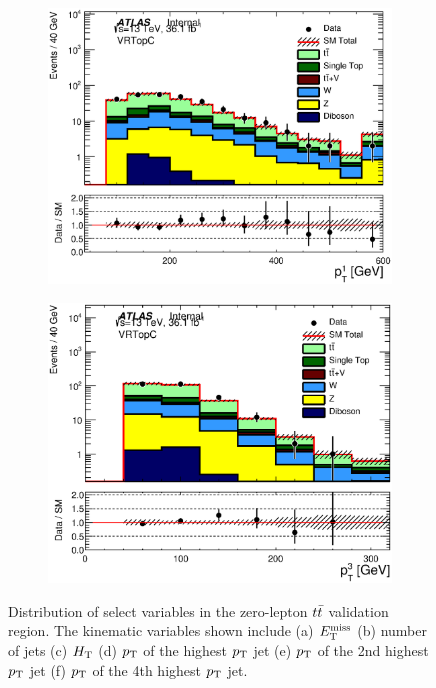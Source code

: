 \begin{figure}[h!]
\begin{center}
\begin{subfigure}[b]{0.40\textwidth}
    	 \includegraphics[width=\textwidth]{figures/plotRegion/JetPt_1__VRTopC_log.eps}
                \caption{ }
    \end{subfigure}
    \begin{subfigure}[b]{0.40\textwidth}    
    	 \includegraphics[width=\textwidth]{figures/plotRegion/JetPt_3__VRTopC_log.eps}
               \caption{ }
    \end{subfigure}
     \caption[Distribution of select variables in the zero-lepton $\ttbar$ validation region]{ Distribution of select variables in the zero-lepton $\ttbar$ validation region.  The kinematic variables shown include (a) $E_{\mathrm{T}}^{\mathrm{miss}}$ (b) number of jets (c) $H_{\mathrm{T}}$ (d) $p_{\mathrm{T}}$ of the highest $p_{\mathrm{T}}$ jet (e) $p_{\mathrm{T}}$ of the 2nd highest $p_{\mathrm{T}}$ jet (f) $p_{\mathrm{T}}$ of the 4th highest $p_{\mathrm{T}}$ jet. }%
  \label{fig:VRTopC1}
    \end{center}
\end{figure}

